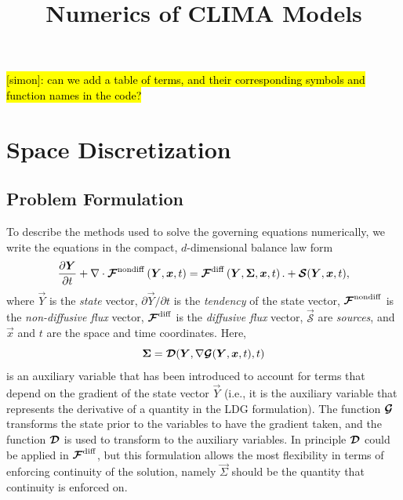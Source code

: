 \documentclass{report}
\title{Numerics of CLIMA Models}
\author{}
\begin{document}
\maketitle
\tableofcontents

\hl{[simon]:  can we add a table of terms, and their corresponding symbols and function names in the code?}

\chapter{Space Discretization}


\section{Problem Formulation}

To describe the methods used to solve the governing equations numerically, we write the equations in the compact, $d$-dimensional balance law form 
\begin{equation}\label{e:eom_compact}
\frac{\partial \boldsymbol{{Y}}}{\partial t} + \nabla \cdot \boldsymbol{{\mathcal{F}}}^{\mathrm{nondiff}}\left(\boldsymbol{{Y}}, \boldsymbol{{x}}, t\right) = \boldsymbol{{\mathcal{F}}}^{\mathrm{diff}}\left(\boldsymbol{{Y}}, \boldsymbol{{\Sigma}}, \boldsymbol{{x}}, t\right). + \boldsymbol{{\mathcal{S}}}(\boldsymbol{{Y}}, \boldsymbol{{x}}, t),
\end{equation}
where $\vec{Y}$ is the \emph{state} vector, $\partial\vec{Y}/\partial t$ is the \emph{tendency} of the state vector, $\boldsymbol{{\mathcal{F}}}^{\mathrm{nondiff}}$ is the \emph{non-diffusive flux} vector, $\boldsymbol{{\mathcal{F}}}^{\mathrm{diff}}$ is the \emph{diffusive flux} vector, $\vec{\mathcal{S}}$ are \emph{sources}, and $\vec{x}$ and $t$ are the space and time coordinates. 
Here, 
\begin{equation}
    \boldsymbol{{\Sigma}} = \boldsymbol{{\mathcal{D}}}(\boldsymbol{{Y}}, \nabla \boldsymbol{{\mathcal{G}}}(\boldsymbol{{Y}}, \boldsymbol{{x}}, t), t)
\end{equation}
is an auxiliary variable that has been introduced to account for terms that depend on the gradient of the state vector $\vec{Y}$ (i.e., it is the auxiliary variable that represents the derivative of a quantity in the LDG formulation). The function $\boldsymbol{{\mathcal{G}}}$ transforms the state prior to the variables to have the gradient taken, and the function $\boldsymbol{{\mathcal{D}}}$ is used to transform to the auxiliary variables. In principle $\boldsymbol{{\mathcal{D}}}$ could be applied in $\boldsymbol{{\mathcal{F}}}^{\mathrm{diff}}$, but this formulation allows the most flexibility in terms of enforcing continuity of the solution, namely $\vec{\Sigma}$ should be the quantity that continuity is enforced on.
\end{document}
